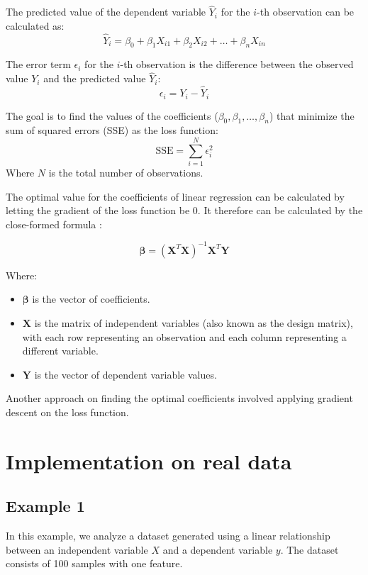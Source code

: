 \documentclass{article}
\begin{document}
The predicted value of the dependent variable $\hat{Y}_i$ for the $i$-th observation can be calculated as:
\begin{equation}
    \hat{Y}_i = \beta_0 + \beta_1 X_{i1} + \beta_2 X_{i2} + \ldots + \beta_n X_{in}
\end{equation}

The error term $\epsilon_i$ for the $i$-th observation is the difference between the observed value $Y_i$ and the predicted value $\hat{Y}_i$:
\begin{equation}
    \epsilon_i = Y_i - \hat{Y}_i
\end{equation}

The goal is to find the values of the coefficients ($\beta_0, \beta_1, \ldots, \beta_n$) that minimize the sum of squared errors (SSE) as the loss function:
\begin{equation}
    \text{SSE} = \sum_{i=1}^{N} \epsilon_i^2
\end{equation}
Where $N$ is the total number of observations.

The optimal value for the coefficients of linear regression can be calculated by letting the gradient of the loss function be 0. It therefore can be calculated by the close-formed formula :

\[
\boldsymbol{\beta} = (\mathbf{X}^T \mathbf{X})^{-1} \mathbf{X}^T \mathbf{Y}
\]

Where:
\begin{itemize}
    \item $\boldsymbol{\beta}$ is the vector of coefficients.
    \item $\mathbf{X}$ is the matrix of independent variables (also known as the design matrix), with each row representing an observation and each column representing a different variable.
    \item $\mathbf{Y}$ is the vector of dependent variable values.
\end{itemize}

Another approach on finding the optimal coefficients involved applying gradient descent on the loss function.

\section{Implementation on real data}
\subsection{Example 1}
In this example, we analyze a dataset generated using a linear relationship between an independent variable \( X \) and a dependent variable \( y \). The dataset consists of 100 samples with one feature.
\end{document}
